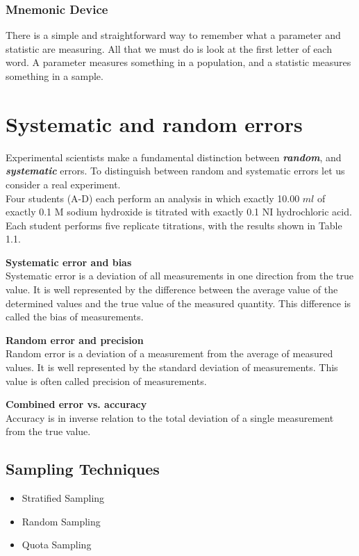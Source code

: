 ﻿\documentclass[]{report}
\begin{document}
\subsubsection*{Mnemonic Device}

There is a simple and straightforward way to remember what a parameter and statistic are measuring. All that we must do is look at the first letter of each word. A parameter measures something in a population, and a statistic measures something in a sample.

\section{Systematic and random errors}
Experimental scientists make a fundamental distinction between \textbf{\emph{random}}, and
\textbf{\emph{systematic}} errors. To distinguish between random and systematic errors let
us consider a real experiment.\\

\noindent Four students (A-D) each perform an analysis in which exactly 10.00 $ml$
of exactly 0.1 M sodium hydroxide is titrated with exactly 0.1 NI
hydrochloric acid.
Each student performs five replicate titrations, with the results shown in
Table 1.1.



\textbf{Systematic error and bias}\\
Systematic error is a deviation of all measurements in one direction from the true value. It is well represented by the difference between the average value of the determined values and the true value
of the measured quantity. This difference is called the bias of measurements.

\textbf{Random error and precision}\\
Random error is a deviation of a measurement from the average of measured values.
It is well represented by the standard deviation of measurements.
This value is often called precision of measurements.

\textbf{Combined error vs. accuracy}\\
Accuracy is in inverse relation to the total deviation of a single measurement from the true value.


\subsection{Sampling Techniques}
\begin{itemize}
\item Stratified Sampling
\item Random Sampling
\item Quota Sampling
\end{itemize}
\end{document}
